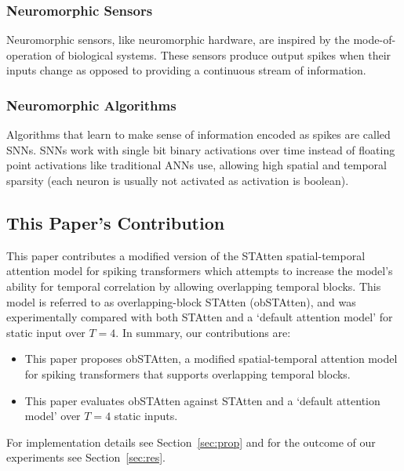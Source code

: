 \documentclass[../main.tex]{subfiles}
\begin{document}
\subsubsection{Neuromorphic Sensors}
Neuromorphic sensors, like neuromorphic hardware, are inspired by the mode-of-operation of biological systems. These sensors produce output spikes when their inputs change as opposed to providing a continuous stream of information\cite{training}. 

\subsubsection{Neuromorphic Algorithms}
Algorithms that learn to make sense of information encoded as spikes are called SNNs\cite{training}. SNNs work with single bit binary activations over time instead of floating point activations like traditional ANNs use, allowing high spatial and temporal sparsity (each neuron is usually not activated as activation is boolean)\cite{training}.

\subsection{This Paper's Contribution}
This paper contributes a modified version of the STAtten spatial-temporal attention model\cite{STAtten} for spiking transformers which attempts to increase the model's ability for temporal correlation by allowing overlapping temporal blocks. This model is referred to as overlapping-block STAtten (obSTAtten), and was experimentally compared with both STAtten and a `default attention model' for static input over $T=4$. In summary, our contributions are:
\begin{itemize}

\item This paper proposes obSTAtten, a modified spatial-temporal attention model for spiking transformers that supports overlapping temporal blocks.

\item This paper evaluates obSTAtten against STAtten and a `default attention model' over $T=4$ static inputs.
\end{itemize}

\noindent For implementation details see Section~\ref{sec:prop} and for the outcome of our experiments see Section~\ref{sec:res}.
\end{document}
